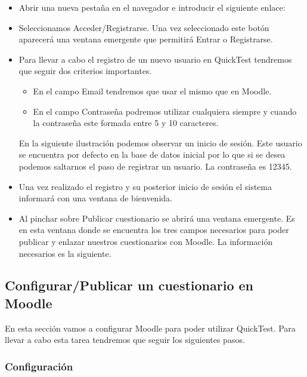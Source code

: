 \begin{itemize}

	\item Abrir una nueva pestaña en el navegador e introducir el siguiente enlace: 
	
	\item Seleccionamos Acceder/Registrarse. Una vez seleccionado este botón aparecerá una ventana emergente que permitirá Entrar o Registrarse.
	
	\item Para llevar a cabo el registro de un nuevo usuario en QuickTest tendremos que seguir dos criterios importantes.
	\begin{itemize}
         \item En el campo Email tendremos que usar el mismo que en Moodle.
         \item En el campo Contraseña podremos utilizar cualquiera siempre y cuando la contraseña este formada entre 5 y 10 caracteres.
    \end{itemize}
    En la siguiente ilustración podemos observar un inicio de sesión. Este usuario se encuentra por defecto en la base de datos inicial por lo que si se desea podemos saltarnos el paso de registrar un usuario. La contraseña es 12345. 
    \item Una vez realizado el registro y su posterior inicio de sesión el sistema informará con una ventana de bienvenida. 
    
    \item Al pinchar sobre Publicar cuestionario se abrirá una ventana emergente. Es en esta ventana donde se encuentra los tres campos necesarios para poder publicar y enlazar nuestros cuestionarios con Moodle. La información necesarios es la siguiente. 
    
	
\end{itemize}


\subsection{Configurar/Publicar un cuestionario en Moodle}

En esta sección vamos a configurar Moodle para poder utilizar QuickTest. Para llevar a cabo esta tarea tendremos que seguir los siguientes pasos.

\subsubsection{Configuración}


